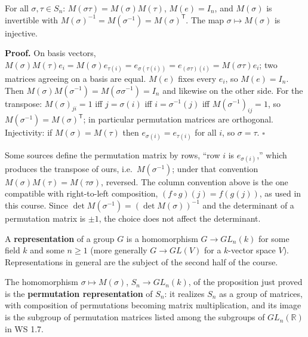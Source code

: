 \documentclass[11pt]{report}
\renewenvironment{proof}[1][Proof]{\noindent\textbf{#1.} }{\hfill$\square$\par\vspace{5pt}}
\begin{document}
\begin{propbox}\label{prop:sigma-maps-m-sigma-injective-homomorphism-sn-to}
For all $\sigma, \tau \in S_n$: $M(\sigma\tau) = M(\sigma) M(\tau)$, $M(e) = I_n$, and $M(\sigma)$ is invertible with $M(\sigma)^{-1} = M(\sigma^{-1}) = M(\sigma)^{\mathsf{T}}$. The map $\sigma \mapsto M(\sigma)$ is injective.
\end{propbox}

\begin{proof}
On basis vectors, $M(\sigma)M(\tau) e_i = M(\sigma) e_{\tau(i)} = e_{\sigma(\tau(i))} = e_{(\sigma\tau)(i)} = M(\sigma\tau) e_i$; two matrices agreeing on a basis are equal. $M(e)$ fixes every $e_i$, so $M(e) = I_n$. Then $M(\sigma)M(\sigma^{-1}) = M(\sigma\sigma^{-1}) = I_n$ and likewise on the other side. For the transpose: $M(\sigma)_{ji} = 1$ iff $j = \sigma(i)$ iff $i = \sigma^{-1}(j)$ iff $M(\sigma^{-1})_{ij} = 1$, so $M(\sigma^{-1}) = M(\sigma)^{\mathsf{T}}$; in particular permutation matrices are orthogonal. Injectivity: if $M(\sigma) = M(\tau)$ then $e_{\sigma(i)} = e_{\tau(i)}$ for all $i$, so $\sigma = \tau$.
\end{proof}

\begin{rembox}\label{rem:row-vs-column-convention}
Some sources define the permutation matrix by rows, ``row $i$ is $e_{\sigma(i)}$,'' which produces the transpose of ours, i.e.\ $M(\sigma^{-1})$; under that convention $M(\sigma)M(\tau) = M(\tau\sigma)$, reversed. The column convention above is the one compatible with right-to-left composition, $(f \circ g)(j) = f(g(j))$, as used in this course. Since $\det M(\sigma^{-1}) = (\det M(\sigma))^{-1}$ and the determinant of a permutation matrix is $\pm 1$, the choice does not affect the determinant.
\end{rembox}

\begin{defbox}[{Representation}]\label{def:representation-permutation-representation}
A \textbf{representation} of a group $G$ is a homomorphism $G \to GL_n(k)$ for some field $k$ and some $n \geq 1$ (more generally $G \to GL(V)$ for a $k$-vector space $V$). Representations in general are the subject of the second half of the course.
\end{defbox}

\begin{defbox}\label{def:permutation-representation}
The homomorphism $\sigma \mapsto M(\sigma)$, $S_n \to GL_n(k)$, of the proposition just proved is the \textbf{permutation representation} of $S_n$: it realizes $S_n$ as a group of matrices, with composition of permutations becoming matrix multiplication, and its image is the subgroup of permutation matrices listed among the subgroups of $GL_n(\mathbb{R})$ in WS 1.7.
\end{defbox}
\end{document}
